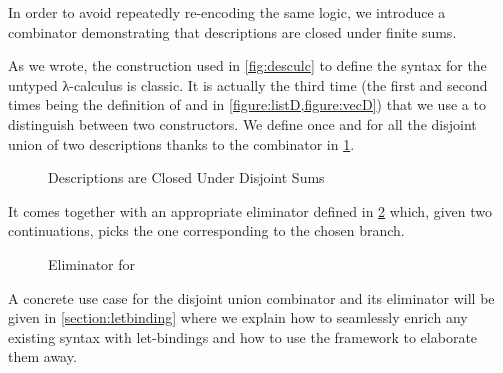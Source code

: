 In order to avoid repeatedly re-encoding the same logic, we introduce
a combinator demonstrating that descriptions are closed under finite
sums.

As we wrote, the construction used in \cref{fig:desculc} to define the
syntax for the untyped λ-calculus is classic. It is actually the third
time (the first and second times being the definition of  and
 in \cref{figure:listD,figure:vecD}) that we use a 
to distinguish between two constructors. We define once and for all
the disjoint union of two descriptions thanks to the  combinator
in \cref{figure:descsum}.

\begin{figure}[h]
  \caption{Descriptions are Closed Under Disjoint Sums\label{figure:descsum}}
\end{figure}

It comes together with an appropriate eliminator  defined in
\cref{figure:descsumelim} which, given two continuations, picks the one
corresponding to the chosen branch.

\begin{figure}[h]
\caption{Eliminator for \label{figure:descsumelim}}
\end{figure}

A concrete use case for the disjoint union combinator and its eliminator
will be given in \cref{section:letbinding} where we explain how to seamlessly
enrich any existing syntax with let-bindings and how to use the 
framework to elaborate them away.




